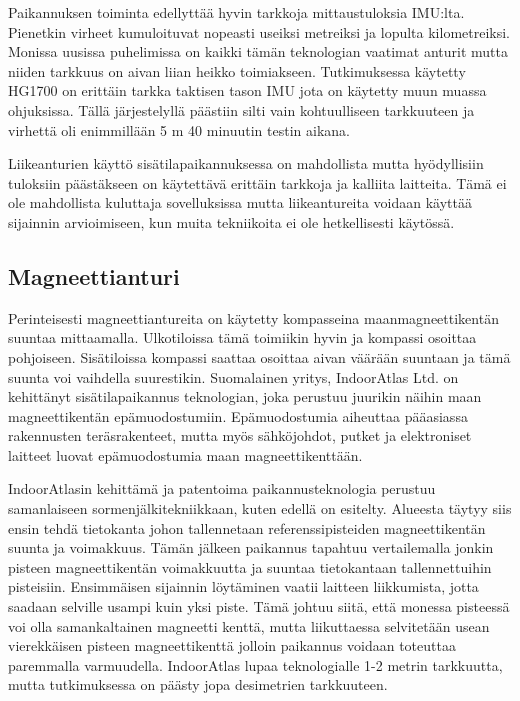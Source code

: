Paikannuksen toiminta edellyttää hyvin tarkkoja mittaustuloksia IMU:lta. Pienetkin virheet kumuloituvat nopeasti useiksi metreiksi ja lopulta kilometreiksi. Monissa uusissa puhelimissa on kaikki tämän teknologian vaatimat anturit mutta niiden tarkkuus on aivan liian heikko toimiakseen. Tutkimuksessa\cite{IMU} käytetty HG1700 on erittäin tarkka taktisen tason IMU jota on käytetty muun muassa ohjuksissa\cite{hg1700}. Tällä järjestelyllä päästiin silti vain kohtuulliseen tarkkuuteen ja virhettä oli enimmillään 5 m 40 minuutin testin aikana\cite{IMU}. 

Liikeanturien käyttö sisätilapaikannuksessa on mahdollista mutta hyödyllisiin tuloksiin päästäkseen on käytettävä erittäin tarkkoja ja kalliita laitteita. Tämä ei ole mahdollista kuluttaja sovelluksissa mutta liikeantureita voidaan käyttää sijainnin arvioimiseen, kun muita tekniikoita ei ole hetkellisesti käytössä.
\subsection{Magneettianturi}
Perinteisesti magneettiantureita on käytetty kompasseina maanmagneettikentän suuntaa mittaamalla. Ulkotiloissa tämä toimiikin hyvin ja kompassi osoittaa pohjoiseen. Sisätiloissa kompassi saattaa osoittaa aivan väärään suuntaan ja tämä suunta voi vaihdella suurestikin. Suomalainen yritys, IndoorAtlas Ltd. on kehittänyt sisätilapaikannus teknologian, joka perustuu juurikin näihin maan magneettikentän epämuodostumiin\cite{atlas}. Epämuodostumia aiheuttaa pääasiassa rakennusten teräsrakenteet, mutta myös sähköjohdot, putket ja elektroniset laitteet luovat epämuodostumia maan magneettikenttään\cite{magneetti}.

IndoorAtlasin kehittämä ja patentoima paikannusteknologia perustuu samanlaiseen sormenjälkitekniikkaan, kuten edellä on esitelty. Alueesta täytyy siis ensin tehdä tietokanta johon tallennetaan referenssipisteiden magneettikentän suunta ja voimakkuus\cite{atlas}. Tämän jälkeen paikannus tapahtuu vertailemalla jonkin pisteen magneettikentän voimakkuutta ja suuntaa tietokantaan tallennettuihin pisteisiin. Ensimmäisen sijainnin löytäminen vaatii laitteen liikkumista, jotta saadaan selville usampi kuin yksi piste\cite{atlas}. Tämä johtuu siitä, että monessa pisteessä voi olla samankaltainen magneetti kenttä, mutta liikuttaessa selvitetään usean vierekkäisen pisteen magneettikenttä jolloin paikannus voidaan toteuttaa paremmalla varmuudella.
IndoorAtlas lupaa teknologialle 1-2 metrin tarkkuutta\cite{atlas}, mutta tutkimuksessa\cite{magneetti} on päästy jopa desimetrien tarkkuuteen.

